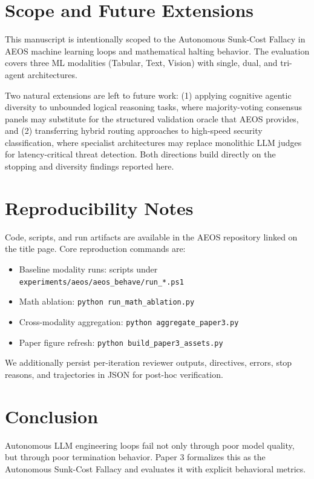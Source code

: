 \documentclass[11pt,a4paper]{article}
\begin{document}
\section{Scope and Future Extensions}

This manuscript is intentionally scoped to the Autonomous Sunk-Cost Fallacy in AEOS machine learning loops and mathematical halting behavior. The evaluation covers three ML modalities (Tabular, Text, Vision) with single, dual, and tri-agent architectures.

Two natural extensions are left to future work: (1) applying cognitive agentic diversity to unbounded logical reasoning tasks, where majority-voting consensus panels may substitute for the structured validation oracle that AEOS provides, and (2) transferring hybrid routing approaches to high-speed security classification, where specialist architectures may replace monolithic LLM judges for latency-critical threat detection. Both directions build directly on the stopping and diversity findings reported here.

\section{Reproducibility Notes}

Code, scripts, and run artifacts are available in the AEOS repository linked on the title page. Core reproduction commands are:
\begin{itemize}
    \item Baseline modality runs: scripts under \texttt{experiments/aeos/aeos\_behave/run\_*.ps1}
    \item Math ablation: \texttt{python run\_math\_ablation.py}
    \item Cross-modality aggregation: \texttt{python aggregate\_paper3.py}
    \item Paper figure refresh: \texttt{python build\_paper3\_assets.py}
\end{itemize}
We additionally persist per-iteration reviewer outputs, directives, errors, stop reasons, and trajectories in JSON for post-hoc verification.

\section{Conclusion}

Autonomous LLM engineering loops fail not only through poor model quality, but through poor termination behavior. Paper 3 formalizes this as the Autonomous Sunk-Cost Fallacy and evaluates it with explicit behavioral metrics.
\end{document}
